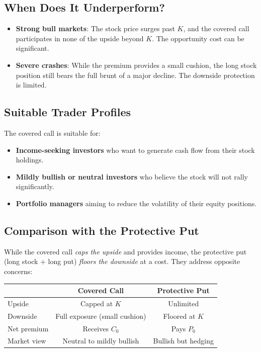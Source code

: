 \documentclass[12pt, a4paper]{article}
\begin{document}
\subsection{When Does It Underperform?}

\begin{itemize}
    \item \textbf{Strong bull markets}: The stock price surges past $K$, and the covered call participates in none of the upside beyond $K$. The opportunity cost can be significant.
    \item \textbf{Severe crashes}: While the premium provides a small cushion, the long stock position still bears the full brunt of a major decline. The downside protection is limited.
\end{itemize}

\subsection{Suitable Trader Profiles}

The covered call is suitable for:
\begin{itemize}
    \item \textbf{Income-seeking investors} who want to generate cash flow from their stock holdings.
    \item \textbf{Mildly bullish or neutral investors} who believe the stock will not rally significantly.
    \item \textbf{Portfolio managers} aiming to reduce the volatility of their equity positions.
\end{itemize}

\subsection{Comparison with the Protective Put}

While the covered call \emph{caps the upside} and provides income, the protective put (long stock + long put) \emph{floors the downside} at a cost. They address opposite concerns:
\begin{center}
\begin{tabular}{lcc}
    \toprule
     & \textbf{Covered Call} & \textbf{Protective Put} \\
    \midrule
    Upside & Capped at $K$ & Unlimited \\
    Downside & Full exposure (small cushion) & Floored at $K$ \\
    Net premium & Receives $C_0$ & Pays $P_0$ \\
    Market view & Neutral to mildly bullish & Bullish but hedging \\
    \bottomrule
\end{tabular}
\end{center}
\end{document}
